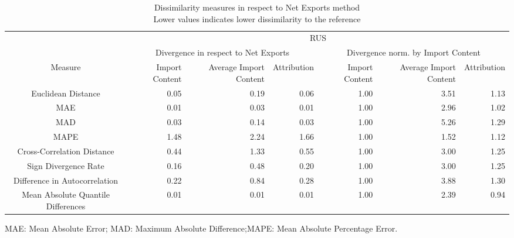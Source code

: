 \begin{table}[t]
\caption*{
{\large Dissimilarity measures in respect to Net Exports method} \\ 
{\small Lower values indicates lower dissimilarity to the reference}
} 
\fontsize{15.0pt}{18.0pt}\selectfont
\begin{tabular*}{\linewidth}{@{\extracolsep{\fill}}crrrrrr}
\toprule
 & \multicolumn{6}{c}{RUS} \\ 
\cmidrule(lr){2-7}
 & \multicolumn{3}{c}{Divergence in respect to Net Exports} & \multicolumn{3}{c}{Divergence norm. by Import Content} \\ 
\cmidrule(lr){2-4} \cmidrule(lr){5-7}
Measure & Import Content & Average Import Content & Attribution & Import Content & Average Import Content & Attribution \\ 
\midrule\addlinespace[2.5pt]
Euclidean Distance & 0.05 & 0.19 & 0.06 & 1.00 & 3.51 & 1.13 \\ 
MAE & 0.01 & 0.03 & 0.01 & 1.00 & 2.96 & 1.02 \\ 
MAD & 0.03 & 0.14 & 0.03 & 1.00 & 5.26 & 1.29 \\ 
MAPE & 1.48 & 2.24 & 1.66 & 1.00 & 1.52 & 1.12 \\ 
Cross-Correlation Distance & 0.44 & 1.33 & 0.55 & 1.00 & 3.00 & 1.25 \\ 
Sign Divergence Rate & 0.16 & 0.48 & 0.20 & 1.00 & 3.00 & 1.25 \\ 
Difference in Autocorrelation & 0.22 & 0.84 & 0.28 & 1.00 & 3.88 & 1.30 \\ 
Mean Absolute Quantile Differences & 0.01 & 0.01 & 0.01 & 1.00 & 2.39 & 0.94 \\ 
\bottomrule
\end{tabular*}
\begin{minipage}{\linewidth}
MAE: Mean Absolute Error; MAD: Maximum Absolute Difference;MAPE: Mean Absolute Percentage Error.\\
\end{minipage}
\end{table}

